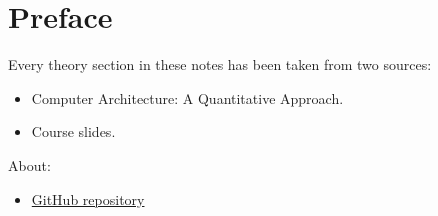 \section*{Preface}

Every theory section in these notes has been taken from two sources:
\begin{itemize}
    \item Computer Architecture: A Quantitative Approach.\cite{hennessy2017computer}
    \item Course slides.\cite{pipelining-slides}
\end{itemize}
About:
\begin{itemize}
    \item[\faIcon{github}] \href{https://github.com/PoliMI-HPC-E-notes-projects-AndreVale69/HPC-E-PoliMI-university-notes}{GitHub repository}
\end{itemize}